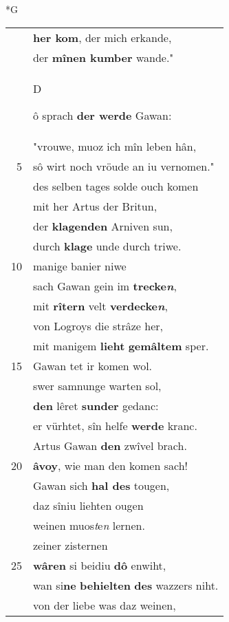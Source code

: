 \documentclass[8pt,a4paper,notitlepage]{article}
\begin{document}
\newpage
\begin{table}[ht]
\begin{minipage}[t]{0.5\linewidth}
\small
\begin{center}*G
\end{center}
\begin{tabular}{rl}
 & \textbf{her kom}, der mich erkande,\\ 
 & der \textbf{mînen kumber} wande."\\ 
 & \begin{large}D\end{large}ô sprach \textbf{der werde} Gawan:\\ 
 & "vrouwe, muoz ich mîn leben hân,\\ 
5 & sô wirt noch vröude an iu vernomen."\\ 
 & des selben tages solde ouch komen\\ 
 & mit her Artus der Britun,\\ 
 & der \textbf{klagenden} Arniven sun,\\ 
 & durch \textbf{klage} unde durch triwe.\\ 
10 & manige banier niwe\\ 
 & sach Gawan gein im \textbf{trecke\textit{n}},\\ 
 & mit \textbf{rîtern} velt \textbf{verdecke\textit{n}},\\ 
 & von Logroys die strâze her,\\ 
 & mit manigem \textbf{lieht} \textbf{gemâltem} sper.\\ 
15 & Gawan tet ir komen wol.\\ 
 & swer samnunge warten sol,\\ 
 & \textbf{den} lêret \textbf{sunder} gedanc:\\ 
 & er vürhtet, sîn helfe \textbf{werde} kranc.\\ 
 & Artus Gawan \textbf{den} zwîvel brach.\\ 
20 & \textbf{âvoy}, wie man den komen sach!\\ 
 & Gawan sich \textbf{hal des} tougen,\\ 
 & daz sîniu liehten ougen\\ 
 & weinen muos\textit{t}e\textit{n} lernen.\\ 
 & zeiner zisternen\\ 
25 & \textbf{wâren} si beidiu \textbf{dô} enwiht,\\ 
 & wan si\textbf{ne} \textbf{behielten} \textbf{des} wazzers niht.\\ 
 & von der liebe was daz weinen,\\ 

\end{tabular}
\end{minipage}
\end{table}
\end{document}
